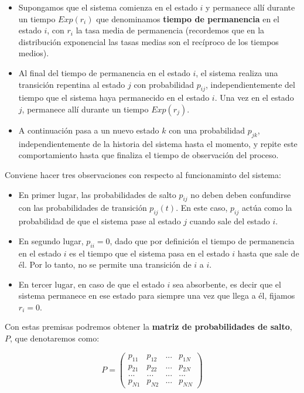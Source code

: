 \documentclass[
]{book}
\providecommand{\tightlist}{%
  \setlength{\itemsep}{0pt}\setlength{\parskip}{0pt}}
\theoremstyle{definition}
\theoremstyle{definition}
\theoremstyle{definition}
\theoremstyle{definition}
\theoremstyle{remark}
\begin{document}
\begin{itemize}
\item
  Supongamos que el sistema comienza en el estado \(i\) y permanece allí durante un tiempo \(Exp(r_i)\) que denominamos \textbf{tiempo de permanencia} en el estado \(i\), con \(r_i\) la tasa media de permanencia (recordemos que en la distribución exponencial las tasas medias son el recíproco de los tiempos medios).
\item
  Al final del tiempo de permanencia en el estado \(i\), el sistema realiza una transición repentina al estado \(j\) con probabilidad \(p_{ij}\), independientemente del tiempo que el sistema haya permanecido en el estado \(i\). Una vez en el estado \(j\), permanece allí durante un tiempo \(Exp(r_j)\).
\item
  A continuación pasa a un nuevo estado \(k\) con una probabilidad \(p_{jk}\), independientemente de la historia del sistema hasta el momento, y repite este comportamiento hasta que finaliza el tiempo de observación del proceso.
\end{itemize}

Conviene hacer tres observaciones con respecto al funcionaminto del sistema:

\begin{itemize}
\tightlist
\item
  En primer lugar, las probabilidades de salto \(p_{ij}\) no deben deben confundirse con las probabilidades de transición \(p_{ij}(t)\). En este caso, \(p_{ij}\) actúa como la probabilidad de que el sistema pase al estado \(j\) cuando sale del estado \(i\).
\item
  En segundo lugar, \(p_{ii} = 0\), dado que por definición el tiempo de permanencia en el estado \(i\) es el tiempo que el sistema pasa en el estado \(i\) hasta que sale de él. Por lo tanto, no se permite una transición de \(i\) a \(i\).
\item
  En tercer lugar, en caso de que el estado \(i\) sea absorbente, es decir que el sistema permanece en ese estado para siempre una vez que llega a él, fijamos \(r_i = 0\).
\end{itemize}

Con estas premisas podremos obtener la \textbf{matriz de probabilidades de salto}, \(P\), que denotaremos como:

\[P = 
\begin{pmatrix}
p_{11} & p_{12} & ... & p_{1N}\\
p_{21} & p_{22} & ... & p_{2N}\\
... & ... & ... & ...\\
p_{N1} & p_{N2} & ... & p_{NN}
\end{pmatrix}\]
\end{document}
